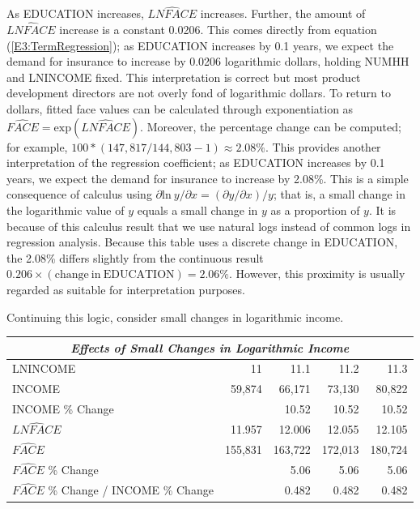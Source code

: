 \noindent As EDUCATION increases,  $\widehat{LNFACE}$ increases.
Further, the amount of $\widehat{LNFACE}$ increase is a constant
0.0206. This comes directly from equation (\ref{E3:TermRegression});
as EDUCATION increases by 0.1 years, we expect the demand for
insurance to increase by 0.0206 logarithmic dollars, holding NUMHH
and LNINCOME fixed. This interpretation is correct but most product
development directors are not overly fond of logarithmic dollars. To
return to dollars, fitted face values can be calculated through
exponentiation as $ \widehat{FACE}=\textrm{exp}(\widehat{LNFACE})$.
Moreover, the percentage change can be computed; for example,
$100*(147,817/144,803 - 1) \approx 2.08\% $. This provides another
interpretation of the regression coefficient; as EDUCATION increases
by 0.1 years, we expect the demand for insurance to increase by
2.08\%. This is a simple consequence of calculus using $ \partial
\textrm{ln} ~y /
\partial x  = \left(\partial y / \partial x \right) / y$; that is, a
small change in the logarithmic value of $y$ equals a small change
in $y$ as a proportion of $y$. It is because of this calculus result
that we use natural logs instead of common logs in regression
analysis. Because this table uses a discrete change in EDUCATION,
the 2.08\% differs slightly from the continuous result $0.206 \times
(\mathrm{change~in~EDUCATION}) = 2.06\%$. However, this proximity is
usually regarded as suitable for interpretation purposes.

Continuing this logic, consider small changes in logarithmic income.

\begin{center}
\begin{tabular}{lrrrr}
\hline \multicolumn{5}{c}{\textit{Effects of Small Changes in Logarithmic Income}} \\
 \hline
  LNINCOME &         11 &       11.1 &       11.2 &       11.3 \\
    INCOME &     59,874 &     66,171 &     73,130 &     80,822 \\
INCOME \% Change  &            &      10.52 &      10.52 &      10.52 \\
\hline
 $\widehat{LNFACE}$ &     11.957 &     12.006 &     12.055 &     12.105 \\
 $\widehat{FACE}$ &    155,831 &    163,722 &    172,013 &    180,724  \\
$\widehat{FACE}$ \% Change &            &       5.06 &       5.06 &       5.06 \\
\hline
$\widehat{FACE}$ \% Change / INCOME \% Change &            &       0.482 &      0.482 &      0.482 \\
\hline
\end{tabular}
\end{center}


